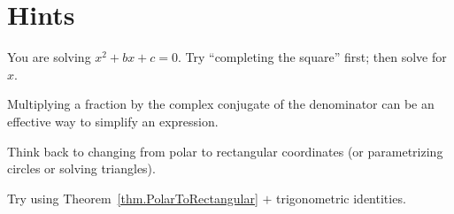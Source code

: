 \chapter{Hints}
\label{chapter:Hints}
\thispagestyle{empty}

\begin{hint*}\label{hint:thm:MonicQuadratic}
You are solving $x^2+bx+c = 0$. Try ``completing the square'' first; then solve for $x$.
\end{hint*}

\begin{hint*}\label{hint:prob.ComplexCheckin}
Multiplying a fraction by the complex conjugate of the denominator can be an effective way to simplify an expression.
\end{hint*}

\begin{hint*}\label{hint:thm.PolarToRectangular}
Think back to changing from polar to rectangular coordinates (or parametrizing circles or solving triangles).
\end{hint*}

\begin{hint*}\label{hint:thm.MultiplyComplex}
Try using Theorem~\ref{thm.PolarToRectangular} $+$ trigonometric identities. 
\end{hint*}


